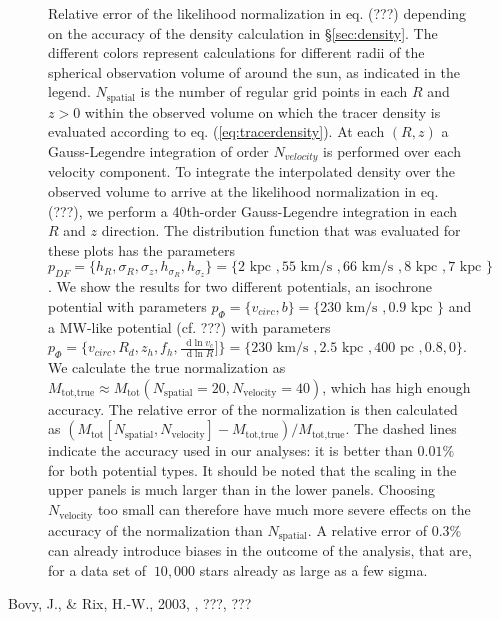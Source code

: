 \documentclass[12pt,preprint]{aastex}
\newcommand*\diff{\mathop{}\!\mathrm{d}}
\begin{document}
\begin{figure}
\caption{Relative error of the likelihood normalization in eq. (???) depending on the accuracy of the density calculation in \S\ref{sec:density}. The different colors represent calculations for different radii of the spherical observation volume of around the sun, as indicated in the legend. $N_\text{spatial}$ is the number of regular grid points in each $R$ and $z > 0$ within the observed volume on which the tracer density is evaluated according to eq. (\ref{eq:tracerdensity}). At each $(R,z)$ a Gauss-Legendre integration of order $N_{velocity}$ is performed over each velocity component. To integrate the interpolated density over the observed volume to arrive at the likelihood normalization in eq. (???), we perform a 40th-order Gauss-Legendre integration in each $R$ and $z$ direction. The distribution function that was evaluated for these plots has the parameters $p_{DF} = \{ h_R, \sigma_R, \sigma_z,h_{\sigma_R},h_{\sigma_z}\} =\{2 \text{ kpc }, 55 \text{ km/s }, 66 \text{ km/s }, 8 \text{ kpc }, 7 \text{ kpc }\} $. We show the results for two different potentials, an isochrone potential with parameters $p_\Phi = \{v_{circ},b \}=\{230 \text{ km/s },0.9\text{ kpc } \}$ and a MW-like potential (cf. ???) with parameters $p_\Phi = \{v_{circ},R_d,z_h,f_h,\frac{\diff\ln v_c}{\diff\ln R}] \}=\{230 \text{ km/s },2.5\text{ kpc },400 \text{ pc }, 0.8,0\}$. We calculate the true normalization as $M_\text{tot,true} \approx M_\text{tot}(N_\text{spatial}=20,N_\text{velocity}=40)$, which has high enough accuracy. The relative error of the normalization is then calculated as $(M_\text{tot}[N_\text{spatial},N_\text{velocity}] -  M_\text{tot,true} ) / M_\text{tot,true} $. The dashed lines indicate the accuracy used in our analyses: it is better than $0.01\%$ for both potential types. It should be noted that the scaling in the upper panels is much larger than in the lower panels. Choosing $N_\text{velocity}$ too small can therefore have much more severe effects on the accuracy of the normalization than $N_\text{spatial}$. A relative error of $0.3\%$ can already introduce biases in the outcome of the analysis, that are, for a data set of $~10,000$ stars already as large as a few sigma.} 
\end{figure}




\begin{thebibliography}{}
 Bovy, J., \& Rix, H.-W., 2003, \apj, ???, ???
\end{thebibliography}
\end{document}
